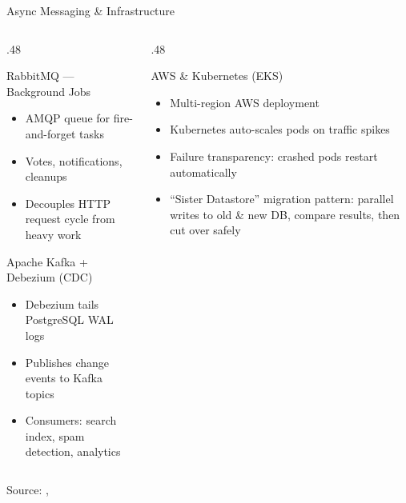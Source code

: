 \documentclass[
  aspectratio=169,
]{beamer}
\begin{document}
\begin{frame}{Async Messaging \& Infrastructure}
  \begin{columns}[T]
    \begin{column}{.48\textwidth}
      \begin{block}{RabbitMQ — Background Jobs}
        \begin{itemize}
          \item AMQP queue for fire-and-forget tasks
          \item Votes, notifications, cleanups
          \item Decouples HTTP request cycle from heavy work
        \end{itemize}
      \end{block}
      \vspace{2mm}
      \begin{block}{Apache Kafka + Debezium (CDC)}
        \begin{itemize}
          \item Debezium tails PostgreSQL WAL logs
          \item Publishes change events to Kafka topics
          \item Consumers: search index, spam detection, analytics
        \end{itemize}
      \end{block}
    \end{column}
    \begin{column}{.48\textwidth}
      \begin{block}{AWS \& Kubernetes (EKS)}
        \begin{itemize}
          \item Multi-region AWS deployment
          \item Kubernetes auto-scales pods on traffic spikes
          \item \alert{Failure transparency}: crashed pods restart automatically
          \item ``Sister Datastore'' migration pattern: parallel writes to old \& new DB, compare results, then cut over safely
        \end{itemize}
      \end{block}
    \end{column}
  \end{columns}
  \vspace{1mm}
  {\footnotesize Source: \cite{bytebytego2024reddit}, \cite{himalayas2024reddit}}
\end{frame}

\section{\bibname}
\begin{frame}[t, allowframebreaks]{\bibname}
\printbibliography[heading=none]
\end{frame}
\end{document}

